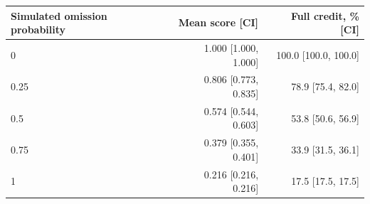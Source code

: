 \begin{tabular}{lrr}\toprule
Simulated omission probability & Mean score [CI] & Full credit, \% [CI]\\ \midrule
0 & 1.000 [1.000, 1.000] & 100.0 [100.0, 100.0]\\
0.25 & 0.806 [0.773, 0.835] & 78.9 [75.4, 82.0]\\
0.5 & 0.574 [0.544, 0.603] & 53.8 [50.6, 56.9]\\
0.75 & 0.379 [0.355, 0.401] & 33.9 [31.5, 36.1]\\
1 & 0.216 [0.216, 0.216] & 17.5 [17.5, 17.5]\\
\bottomrule\end{tabular}
